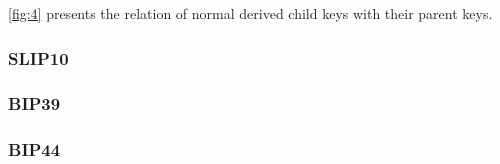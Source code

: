 \autoref{fig:4} presents the relation of normal derived child keys with their parent keys. 







\subsubsection{SLIP10}
\label{SLIP10}

\subsubsection{BIP39}
\subsubsection{BIP44}

